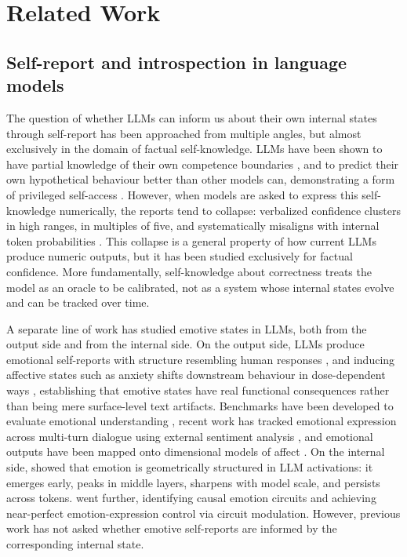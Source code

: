 \documentclass[10pt]{article}
\begin{document}
\section{Related Work}
\label{sec:related}

\subsection{Self-report and introspection in language models}
\label{sec:rw-introspection}

The question of whether LLMs can inform us about their own internal states through self-report has been approached from multiple angles, but almost exclusively in the domain of factual self-knowledge. LLMs have been shown to have partial knowledge of their own competence boundaries \citep{Kadavath2022, Yin2023}, and to predict their own hypothetical behaviour better than other models can, demonstrating a form of privileged self-access \citep{Binder2025}. However, when models are asked to express this self-knowledge numerically, the reports tend to collapse: verbalized confidence clusters in high ranges, in multiples of five, and systematically misaligns with internal token probabilities \citep{Xiong2024, Kumar2024, Yona2024, Geng2024}. This collapse is a general property of how current LLMs produce numeric outputs, but it has been studied exclusively for factual confidence. More fundamentally, self-knowledge about correctness treats the model as an oracle to be calibrated, not as a system whose internal states evolve and can be tracked over time.

A separate line of work has studied emotive states in LLMs, both from the output side and from the internal side. On the output side, LLMs produce emotional self-reports with structure resembling human responses \citep{Tavast2022}, and inducing affective states such as anxiety shifts downstream behaviour in dose-dependent ways \citep{CodaForno2023}, establishing that emotive states have real functional consequences rather than being mere surface-level text artifacts. Benchmarks have been developed to evaluate emotional understanding \citep{Huang2023, Sabour2024}, recent work has tracked emotional expression across multi-turn dialogue using external sentiment analysis \citep{Fazzi2025}, and emotional outputs have been mapped onto dimensional models of affect \citep{Russell1980, IshikawaYoshino2025}. On the internal side, \citet{ZhangZhong2025} showed that emotion is geometrically structured in LLM activations: it emerges early, peaks in middle layers, sharpens with model scale, and persists across tokens. \citet{WangEmotion2025} went further, identifying causal emotion circuits and achieving near-perfect emotion-expression control via circuit modulation. However, previous work has not asked whether emotive self-reports are informed by the corresponding internal state.
\end{document}

